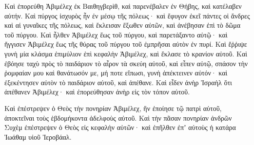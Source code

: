 {\par }{\PP {}Καὶ ἐπορεύθη Ἀβιμέλεχ ἐκ Βαιθηγβερὶθ, καὶ παρενέβαλεν ἐν Θήβης, καὶ κατέλαβεν αὐτήν.
Καὶ πύργος ἰσχυρὸς ἦν ἐν μέσῳ τῆς πόλεως· καὶ ἔφυγον ἐκεῖ πάντες οἱ ἄνδρες καὶ αἱ γυναῖκες τῆς πόλεως, καὶ ἔκλεισαν ἔξωθεν αὐτῶν, καὶ ἀνέβησαν ἐπὶ τὸ δῶμα τοῦ πύργου.
Καὶ ἦλθεν Ἀβιμέλεχ ἕως τοῦ πύργου, καὶ παρετάξαντο αὐτῷ· καὶ ἤγγισεν Ἀβιμέλεχ ἕως τῆς θύρας τοῦ πύργου τοῦ ἐμπρῆσαι αὐτὸν ἐν πυρί.
Καὶ ἔῤῥιψε γυνὴ μία κλάσμα ἐπιμύλιον ἐπὶ κεφαλὴν Ἀβιμέλεχ, καὶ ἔκλασε τὸ κρανίον αὐτοῦ.
Καὶ ἐβόησε ταχὺ πρὸς τὸ παιδάριον τὸ αἶρον τὰ σκεύη αὐτοῦ, καὶ εἶπεν αὐτῷ, σπάσον τὴν ῥομφαίαν μου καὶ θανάτωσόν με, μή ποτε εἴπωσι, γυνὴ ἀπέκτεινεν αὐτόν· καὶ ἐξεκέντησεν αὐτὸν τὸ παιδάριον αὐτοῦ, καὶ ἀπέθανε.
Καὶ εἶδεν ἀνὴρ Ἰσραὴλ ὅτι ἀπέθανεν Ἀβιμέλεχ· καὶ ἐπορεύθησαν ἀνὴρ εἰς τὸν τόπον αὐτοῦ.
\par }{\PP {}Καὶ ἐπέστρεψεν ὁ Θεὸς τὴν πονηρίαν Ἀβιμέλεχ, ἣν ἐποίησε τῷ πατρὶ αὐτοῦ, ἀποκτεῖναι τοὺς ἑβδομήκοντα ἀδελφοὺς αὐτοῦ.
Καὶ τὴν πᾶσαν πονηρίαν ἀνδρῶν Συχὲμ ἐπέστρεψεν ὁ Θεὸς εἰς κεφαλὴν αὐτῶν· καὶ ἐπῆλθεν ἐπʼ αὐτοὺς ἡ κατάρα Ἰωάθαμ υἱοῦ Ἰεροβάαλ.

}
